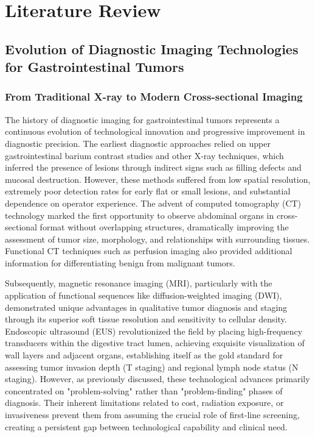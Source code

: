 
\chapter{Literature Review} \label{chp:literature}

\section{Evolution of Diagnostic Imaging Technologies for Gastrointestinal Tumors}

\subsection{From Traditional X-ray to Modern Cross-sectional Imaging}

The history of diagnostic imaging for gastrointestinal tumors represents a continuous evolution of technological innovation and progressive improvement in diagnostic precision. The earliest diagnostic approaches relied on upper gastrointestinal barium contrast studies and other X-ray techniques, which inferred the presence of lesions through indirect signs such as filling defects and mucosal destruction. However, these methods suffered from low spatial resolution, extremely poor detection rates for early flat or small lesions, and substantial dependence on operator experience. The advent of computed tomography (CT) technology marked the first opportunity to observe abdominal organs in cross-sectional format without overlapping structures, dramatically improving the assessment of tumor size, morphology, and relationships with surrounding tissues. Functional CT techniques such as perfusion imaging also provided additional information for differentiating benign from malignant tumors.

Subsequently, magnetic resonance imaging (MRI), particularly with the application of functional sequences like diffusion-weighted imaging (DWI), demonstrated unique advantages in qualitative tumor diagnosis and staging through its superior soft tissue resolution and sensitivity to cellular density. Endoscopic ultrasound (EUS) revolutionized the field by placing high-frequency transducers within the digestive tract lumen, achieving exquisite visualization of wall layers and adjacent organs, establishing itself as the gold standard for assessing tumor invasion depth (T staging) and regional lymph node status (N staging). However, as previously discussed, these technological advances primarily concentrated on "problem-solving" rather than "problem-finding" phases of diagnosis. Their inherent limitations related to cost, radiation exposure, or invasiveness prevent them from assuming the crucial role of first-line screening, creating a persistent gap between technological capability and clinical need.

